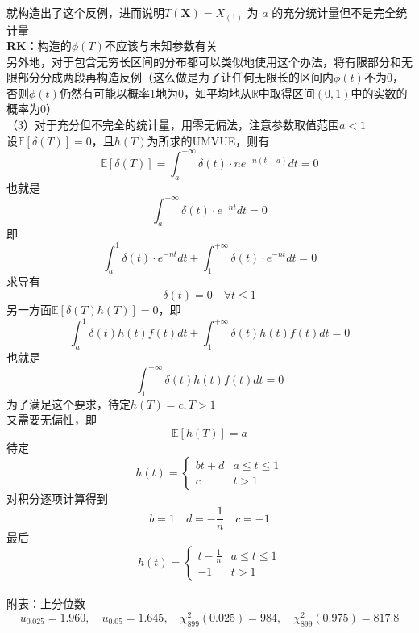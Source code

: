 \documentclass[UTF8,openany]{book}
\begin{document}
	就构造出了这个反例，进而说明$T(\boldsymbol{X})=X_{(1)}$ 为 $a$ 的充分统计量但不是完全统计量\\
	\textbf{RK}：构造的$\phi(T)$不应该与未知参数有关\\
	另外地，对于包含无穷长区间的分布都可以类似地使用这个办法，将有限部分和无限部分分成两段再构造反例（这么做是为了让任何无限长的区间内$\phi(t)$不为0，否则$\phi(t)$仍然有可能以概率1地为0，如平均地从$\mathbb{R}$中取得区间$(0,1)$中的实数的概率为0）\\
	（3）对于充分但不完全的统计量，用零无偏法，注意参数取值范围$a<1$\\
	设$\mathbb{E}[\delta(T)]=0$，且$h(T)$为所求的UMVUE，则有
	\[
	\mathbb{E}[\delta(T)]=\int_a^{+\infty} \delta(t) \cdot n e^{-n(t-a)} d t=0 
	\]
	也就是
	\[
	\int_a^{+\infty} \delta(t) \cdot  e^{-nt} d t=0 
	\]
	即
	\[
	\int_a^{1} \delta(t) \cdot  e^{-nt} d t+\int_1^{+\infty} \delta(t) \cdot  e^{-nt} d t=0 
	\]
	求导有
	\[
	\delta(t)=0\quad \forall t \le 1
	\]
	另一方面$\mathbb{E}\left[\delta(T)h(T) \right]=0 $，即
	\[
	\int_a^{1} \delta(t)h(t)f(t)d t+\int_1^{+\infty} \delta(t)h(t)f(t) d t=0
	\]
	也就是
	\[
	\int_1^{+\infty} \delta(t)h(t)f(t) d t=0
	\]
	为了满足这个要求，待定$h(T)=c,T>1$\\
	又需要无偏性，即
	\[
	\mathbb{E}[h(T)]=a
	\]
	待定
	\[
	h(t)=
	\begin{cases}
		bt+d  &  a\le t \le 1\\
		c  &  t>1
	\end{cases}
	\]
	对积分逐项计算得到
	\[
	b=1\quad d=-\frac{1}{n}\quad c=-1
	\]
	最后
	\[
	h(t)=
	\begin{cases}
		t-\frac{1}{n}  &  a\le t \le 1\\
		-1  &  t>1
	\end{cases}
	\]\\
	
	
	
	
	
	
	
	\noindent 附表：上分位数
	$$
	u_{0.025}=1.960, \quad u_{0.05}=1.645, \quad \chi_{899}^2(0.025)=984, \quad \chi_{899}^2(0.975)=817.8
	$$
	\newpage
\end{document}
